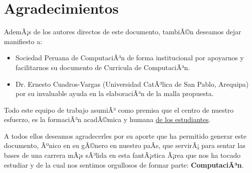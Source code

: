 \chapter*{Agradecimientos}\label{chap:cs-ack}
%

AdemÃ¡s de los autores directos de este documento, tambiÃ©n deseamos dejar manifiesto a:

\begin{itemize}
\item Sociedad Peruana de ComputaciÃ³n de forma institucional por apoyarnos y facilitarnos su documento de Curricula de ComputaciÃ³n.

\item Dr. Ernesto Cuadros-Vargas (Universidad CatÃ³lica de San Pablo, Arequipa) por su invaluable ayuda en la elaboraciÃ³n de la malla propuesta. 
\end{itemize}

Todo este equipo de trabajo asumiÃ³ como premisa que el centro de nuestro esfuerzo,
es la formaciÃ³n acadÃ©mica y humana \underline{de los estudiantes}.

A todos ellos deseamos agradecerles por su aporte que ha permitido generar 
este documento, Ãºnico en su gÃ©nero en nuestro paÃ­s, que servirÃ¡ para sentar las 
bases de una carrera mÃ¡s sÃ³lida en esta fantÃ¡stica Ã¡rea que nos ha tocado estudiar y 
de la cual nos sentimos orgullosos de formar parte: \textbf{ComputaciÃ³n}.
